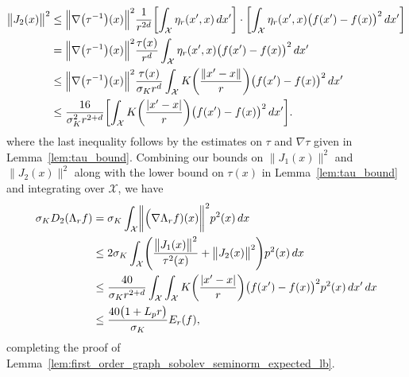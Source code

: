 \documentclass{article}
\newcommand{\1}{\mathbf{1}}
\newcommand{\Xset}{\mathcal{X}}
\theoremstyle{alden}
\theoremstyle{aldenthm}
\theoremstyle{definition}
\theoremstyle{remark}
\begin{document}
\begin{align*}
\bigl\|J_2(x)\bigr\|^2 & \leq \Bigl\|\nabla\bigl(\tau^{-1}\bigr)(x)\Bigr\|^2\frac{1}{r^{2d}} \biggl[\int_{\Xset}\eta_r(x',x) \,dx'\biggr] \cdot \biggl[\int_{\Xset} \eta_r(x',x)\bigl(f(x') - f(x)\bigr)^2 \,dx' \biggr] \\
& = \Bigl\|\nabla\bigl(\tau^{-1}\bigr)(x)\Bigr\|^2\frac{\tau(x)}{r^d} \int_{\Xset} \eta_r(x',x)\bigl(f(x') - f(x)\bigr)^2 \,dx'\\ 
& \leq \Bigl\|\nabla\bigl(\tau^{-1}\bigr)(x)\Bigr\|^2\frac{\tau(x)}{\sigma_K r^d}\int_{\Xset} K\biggl(\frac{\|x' - x\|}{r}\biggr)\bigl(f(x') - f(x)\bigr)^2 \,dx' \\
& \leq \frac{16}{\sigma_K^2r^{2 + d}} \biggl[\int_{\Xset} K\biggl(\frac{|x' - x|}{r}\biggr)\bigl(f(x') - f(x)\bigr)^2 \,dx' \biggr].
\end{align*}
where the last inequality follows by the estimates on $\tau$ and $\nabla \tau$ given in Lemma~\ref{lem:tau_bound}. Combining our bounds on $\bigl\|J_1(x)\bigr\|^2$ and $\bigl\|J_2(x)\bigr\|^2$ along with the lower bound on $\tau(x)$ in Lemma~\ref{lem:tau_bound} and integrating over $\Xset$, we have
\begin{align*}
\sigma_K D_2(\Lambda_r f) & = \sigma_K\int_{\Xset} \biggl\|\Bigl(\nabla \Lambda_rf)(x)\biggr\|^2 p^2(x) \,dx \\
& \leq 2 \sigma_K \int_{\Xset} \Biggl(\frac{\bigl\|J_1(x)\bigr\|^2}{\tau^2(x)} + \bigl\|J_2(x)\bigr\|^2\Biggr) p^2(x) \,dx \\
& \leq \frac{40}{\sigma_K r^{2 + d}} \int_{\Xset} \int_{\Xset} K\biggl(\frac{|x' - x|}{r}\biggr)\bigl(f(x') - f(x)\bigr)^2 p^2(x) \,dx' \,dx \\
& \leq \frac{40 \bigl(1 + L_p r\bigr)}{\sigma_K} E_r(f),
\end{align*}
completing the proof of Lemma~\ref{lem:first_order_graph_sobolev_seminorm_expected_lb}. 
\end{document}
